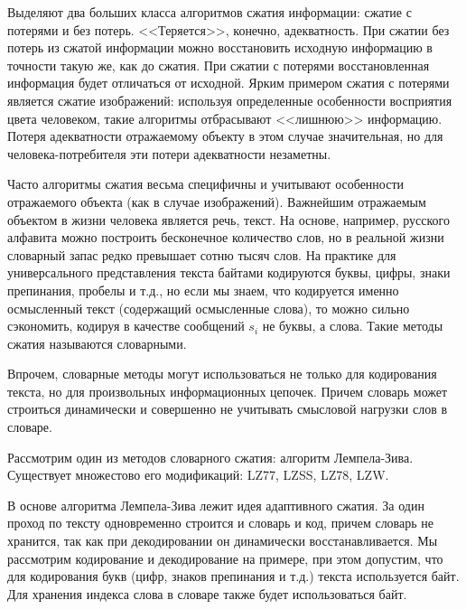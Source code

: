 Выделяют два больших класса алгоритмов сжатия информации: сжатие с потерями и без потерь. <<Теряется>>, конечно, адекватность. При сжатии без потерь из сжатой информации можно восстановить исходную информацию в точности такую же, как до сжатия. При сжатии с потерями восстановленная информация будет отличаться от исходной. Ярким примером сжатия с потерями является сжатие изображений: используя определенные особенности восприятия цвета человеком, такие алгоритмы отбрасывают <<лишнюю>> информацию. Потеря адекватности отражаемому объекту в этом случае значительная, но для человека-потребителя эти потери адекватности незаметны.

Часто алгоритмы сжатия весьма специфичны и учитывают особенности отражаемого объекта (как в случае изображений). Важнейшим отражаемым объектом в жизни человека является речь, текст. На основе, например, русского алфавита можно построить бесконечное количество слов, но в реальной жизни словарный запас редко превышает сотню тысяч слов. На практике для универсального представления текста байтами кодируются буквы, цифры, знаки препинания, пробелы и т.д., но если мы знаем, что кодируется именно осмысленный текст (содержащий осмысленные слова), то можно сильно сэкономить, кодируя в качестве сообщений $s_i$ не буквы, а слова. Такие методы сжатия называются словарными. 

Впрочем, словарные методы могут использоваться не только для кодирования текста, но для произвольных информационных цепочек. Причем словарь может строиться динамически и совершенно не учитывать смысловой нагрузки слов в словаре.

Рассмотрим один из методов словарного сжатия: алгоритм Лемпела-Зива. Существует множестово его модификаций: LZ77, LZSS, LZ78, LZW.

В основе алгоритма Лемпела-Зива лежит идея адаптивного сжатия. За один проход по тексту одновременно строится и словарь и код, причем словарь не хранится, так как при декодировании он динамически восстанавливается. Мы рассмотрим кодирование и декодирование на примере, при этом допустим, что для кодирования букв (цифр, знаков препинания и т.д.) текста используется байт. Для хранения индекса слова в словаре также будет использоваться байт.


